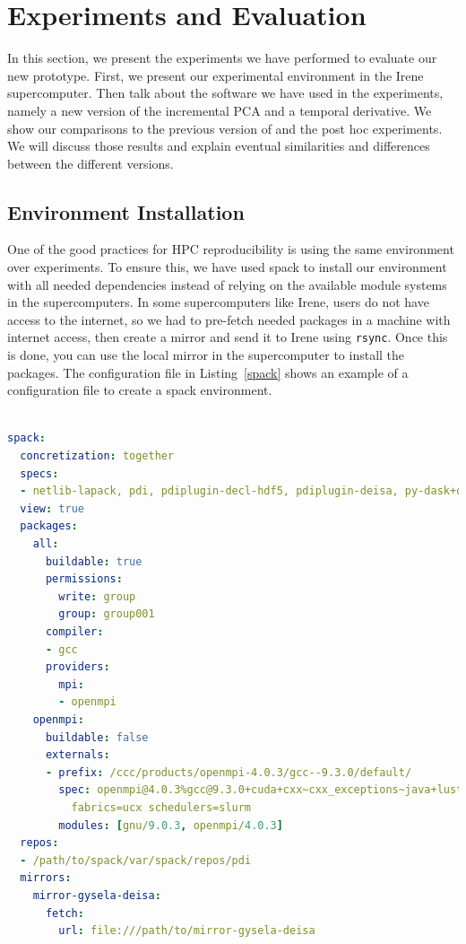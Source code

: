 \section{Experiments and Evaluation}
In this section, we present the experiments we have performed to evaluate our new prototype. First, we present our experimental environment in the Irene supercomputer. Then talk about the software we have used in the experiments, namely a new version of the incremental PCA and a temporal derivative. We show our comparisons to the previous version of \deisa and the post hoc experiments. We will discuss those results and explain eventual similarities and differences between the different versions.  

\subsection{Environment Installation}
One of the good practices for HPC reproducibility is using the same environment over experiments. To ensure this, we have used spack to install our environment with all needed dependencies instead of relying on the available module systems in the supercomputers. 
In some supercomputers like Irene, users do not have access to the internet, so we had to pre-fetch needed packages in a machine with internet access, then create a mirror and send it to Irene using \texttt{rsync}. Once this is done, you can use the local mirror in the supercomputer to install the packages.  The configuration file in Listing~\ref{spack} shows an example of a configuration file to create a spack environment.     

\begin{lstlisting}[float, label=spack, language=yaml, caption=Spack environment installation configuration file]

spack:
  concretization: together
  specs:
  - netlib-lapack, pdi, pdiplugin-decl-hdf5, pdiplugin-deisa, py-dask+diagnostics py-h5py, pdiplugin-mpi, pdiplugin-pycall
  view: true
  packages:
    all:
      buildable: true
      permissions:
        write: group
        group: group001
      compiler:
      - gcc
      providers:
        mpi:
        - openmpi
    openmpi:
      buildable: false
      externals:
      - prefix: /ccc/products/openmpi-4.0.3/gcc--9.3.0/default/
        spec: openmpi@4.0.3%gcc@9.3.0+cuda+cxx~cxx_exceptions~java+lustre~memchecker+pmi+pmix~sqlite3~static~thread_multiple~wrapper-rpath
          fabrics=ucx schedulers=slurm
        modules: [gnu/9.0.3, openmpi/4.0.3]
  repos:
  - /path/to/spack/var/spack/repos/pdi
  mirrors:
    mirror-gysela-deisa:
      fetch:
        url: file:///path/to/mirror-gysela-deisa

\end{lstlisting}

